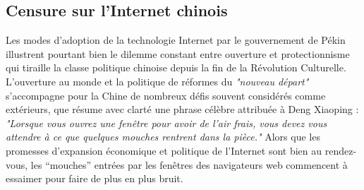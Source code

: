 \subsection[Censure sur l’Internet chinois]{Censure sur l’Internet chinois}
Les modes d’adoption de la technologie Internet par le gouvernement de Pékin illustrent pourtant bien le dilemme constant entre ouverture et protectionnisme qui tiraille la classe politique chinoise depuis la fin de la Révolution Culturelle. L’ouverture au monde et la politique de réformes du \textit{"nouveau départ"} s’accompagne pour la Chine de nombreux défis souvent considérés comme extérieurs, que résume avec clarté une phrase célèbre attribuée à Deng Xiaoping : \textit{"Lorsque vous ouvrez une fenêtre pour avoir de l’air frais, vous devez vous attendre à ce que quelques mouches rentrent dans la pièce."} Alors que les promesses d’expansion économique et politique de l’Internet sont bien au rendez-vous, les “mouches” entrées par les fenêtres des navigateurs web commencent à essaimer pour faire de plus en plus bruit. 

